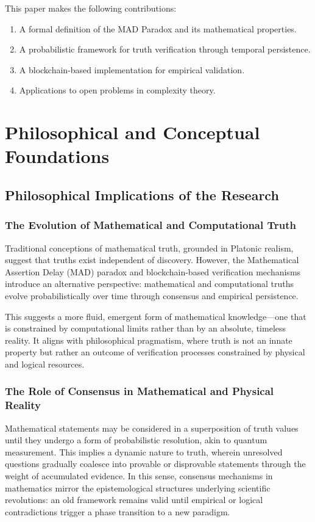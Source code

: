 \documentclass[11pt]{article}
\begin{document}
This paper makes the following contributions:
\begin{enumerate}[label=(\arabic*)]
    \item A formal definition of the MAD Paradox and its mathematical properties.
    \item A probabilistic framework for truth verification through temporal persistence.
    \item A blockchain-based implementation for empirical validation.
    \item Applications to open problems in complexity theory.
\end{enumerate}

\section{Philosophical and Conceptual Foundations}
\subsection{Philosophical Implications of the Research}

\subsubsection{The Evolution of Mathematical and Computational Truth}
Traditional conceptions of mathematical truth, grounded in Platonic realism, suggest that truths exist independent of discovery. However, the Mathematical Assertion Delay (MAD) paradox and blockchain-based verification mechanisms introduce an alternative perspective: mathematical and computational truths evolve probabilistically over time through consensus and empirical persistence.

This suggests a more fluid, emergent form of mathematical knowledge—one that is constrained by computational limits rather than by an absolute, timeless reality. It aligns with philosophical pragmatism, where truth is not an innate property but rather an outcome of verification processes constrained by physical and logical resources.

\subsubsection{The Role of Consensus in Mathematical and Physical Reality}
Mathematical statements may be considered in a superposition of truth values until they undergo a form of probabilistic resolution, akin to quantum measurement. This implies a dynamic nature to truth, wherein unresolved questions gradually coalesce into provable or disprovable statements through the weight of accumulated evidence. In this sense, consensus mechanisms in mathematics mirror the epistemological structures underlying scientific revolutions: an old framework remains valid until empirical or logical contradictions trigger a phase transition to a new paradigm.
\end{document}
